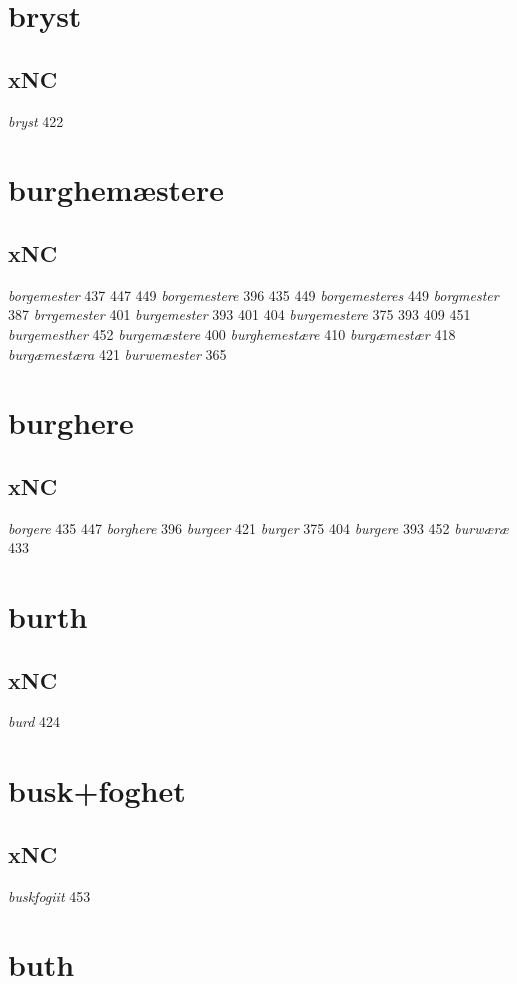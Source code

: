 \documentclass[a4paper,twocolumn]{article}
\begin{document}
\section{bryst}
\label{sec:org49ea27d}
\subsection{xNC}
\label{sec:orgf9b3b1e}
\emph{bryst} 422 
\section{burghemæstere}
\label{sec:org63a3540}
\subsection{xNC}
\label{sec:org54e4790}
\emph{borgemester} 437 447 449 \emph{borgemestere} 396 435 449 \emph{borgemesteres} 449 \emph{borgmester} 387 \emph{brrgemester} 401 \emph{burgemester} 393 401 404 \emph{burgemestere} 375 393 409 451 \emph{burgemesther} 452 \emph{burgemæstere} 400 \emph{burghemestære} 410 \emph{burgæmestær} 418 \emph{burgæmestæra} 421 \emph{burwemester} 365 
\section{burghere}
\label{sec:org0c21533}
\subsection{xNC}
\label{sec:org24b2b2e}
\emph{borgere} 435 447 \emph{borghere} 396 \emph{burgeer} 421 \emph{burger} 375 404 \emph{burgere} 393 452 \emph{burwæræ} 433 
\section{burth}
\label{sec:org1ca370d}
\subsection{xNC}
\label{sec:org68c17b3}
\emph{burd} 424 
\section{busk+foghet}
\label{sec:orgd59f378}
\subsection{xNC}
\label{sec:orgb1a8dc4}
\emph{buskfogiit} 453 
\section{buth}
\label{sec:org494bedc}
\end{document}
